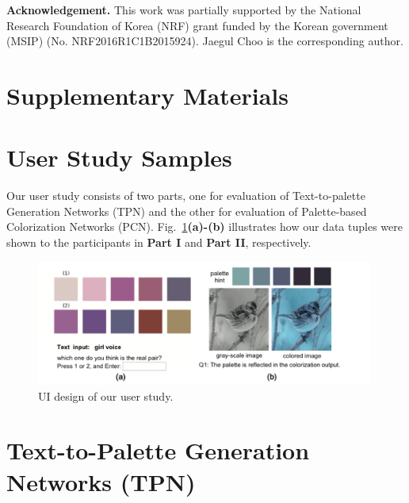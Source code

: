 \documentclass[runningheads]{llncs}
\begin{document}
\vspace{0.1in}
\noindent\textbf{Acknowledgement.} This work was partially supported by the National Research Foundation of Korea (NRF) grant funded by the Korean government (MSIP) (No. NRF2016R1C1B2015924). Jaegul Choo is the corresponding author. 
\clearpage

%
%
%
% 
% 
%



\clearpage

\section*{Supplementary Materials}
\section{User Study Samples}
Our user study consists of two parts, one for evaluation of Text-to-palette Generation Networks (TPN) and the other for evaluation of Palette-based Colorization Networks (PCN). Fig.~\ref{fig:user_study}\textbf{(a)-(b)} illustrates how our data tuples were shown to the participants in \textbf{Part I} and \textbf{Part II}, respectively. 


\begin{figure}[h!]
\centering 
\includegraphics[width=0.99\textwidth]{./user_study.png}
\vspace*{-2mm}\caption{UI design of our user study.}\label{fig:user_study}
\end{figure}



\section{Text-to-Palette Generation Networks (TPN)}
\end{document}
